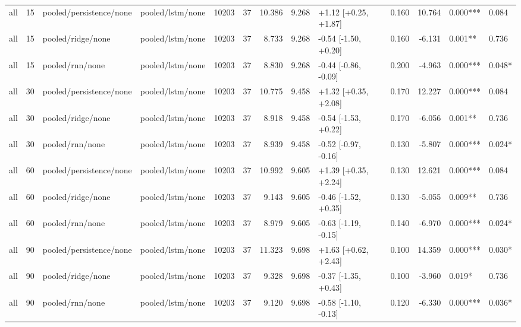 \begin{tabular}{lrllrrrrlrrll}
all & 15 & pooled/persistence/none & pooled/lstm/none & 10203 & 37 & 10.386 & 9.268 & +1.12 [+0.25, +1.87] & 0.160 & 10.764 & 0.000*** & 0.084 \\
all & 15 & pooled/ridge/none & pooled/lstm/none & 10203 & 37 & 8.733 & 9.268 & -0.54 [-1.50, +0.20] & 0.160 & -6.131 & 0.001** & 0.736 \\
all & 15 & pooled/rnn/none & pooled/lstm/none & 10203 & 37 & 8.830 & 9.268 & -0.44 [-0.86, -0.09] & 0.200 & -4.963 & 0.000*** & 0.048* \\
all & 30 & pooled/persistence/none & pooled/lstm/none & 10203 & 37 & 10.775 & 9.458 & +1.32 [+0.35, +2.08] & 0.170 & 12.227 & 0.000*** & 0.084 \\
all & 30 & pooled/ridge/none & pooled/lstm/none & 10203 & 37 & 8.918 & 9.458 & -0.54 [-1.53, +0.22] & 0.170 & -6.056 & 0.001** & 0.736 \\
all & 30 & pooled/rnn/none & pooled/lstm/none & 10203 & 37 & 8.939 & 9.458 & -0.52 [-0.97, -0.16] & 0.130 & -5.807 & 0.000*** & 0.024* \\
all & 60 & pooled/persistence/none & pooled/lstm/none & 10203 & 37 & 10.992 & 9.605 & +1.39 [+0.35, +2.24] & 0.130 & 12.621 & 0.000*** & 0.084 \\
all & 60 & pooled/ridge/none & pooled/lstm/none & 10203 & 37 & 9.143 & 9.605 & -0.46 [-1.52, +0.35] & 0.130 & -5.055 & 0.009** & 0.736 \\
all & 60 & pooled/rnn/none & pooled/lstm/none & 10203 & 37 & 8.979 & 9.605 & -0.63 [-1.19, -0.15] & 0.140 & -6.970 & 0.000*** & 0.024* \\
all & 90 & pooled/persistence/none & pooled/lstm/none & 10203 & 37 & 11.323 & 9.698 & +1.63 [+0.62, +2.43] & 0.100 & 14.359 & 0.000*** & 0.030* \\
all & 90 & pooled/ridge/none & pooled/lstm/none & 10203 & 37 & 9.328 & 9.698 & -0.37 [-1.35, +0.43] & 0.100 & -3.960 & 0.019* & 0.736 \\
all & 90 & pooled/rnn/none & pooled/lstm/none & 10203 & 37 & 9.120 & 9.698 & -0.58 [-1.10, -0.13] & 0.120 & -6.330 & 0.000*** & 0.036* \\
\bottomrule
\end{tabular}
